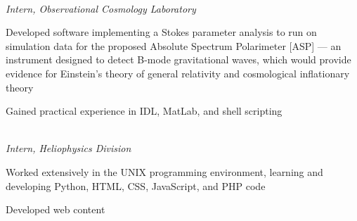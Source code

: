 \\  
\vspace{-0.8em}
\textit{Intern, Observational Cosmology Laboratory} 
\begin{itemize*}
  \item Developed software implementing a Stokes parameter analysis to
    run on simulation data for the proposed Absolute Spectrum
    Polarimeter [ASP] — an instrument designed to detect B-mode
    gravitational waves, which would provide evidence for Einstein’s
    theory of general relativity and cosmological inflationary theory
  \item Gained practical experience in IDL, MatLab, and shell scripting
\end{itemize*}


\\  
\vspace{-0.8em}
\textit{Intern,  Heliophysics Division}
\begin{itemize*}
  \item Worked extensively in the UNIX programming environment, learning and
    developing Python, HTML, CSS, JavaScript, and PHP code
  \item Developed web content  %
\end{itemize*}

